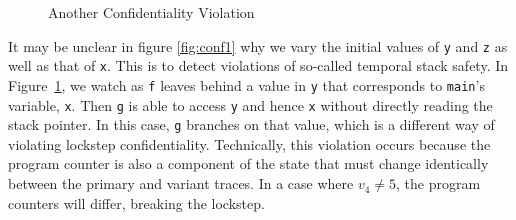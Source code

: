 \documentclass[acmsmall,review,anonymous]{acmart}\settopmatter{printfolios=true,printccs=false,printacmref=false}
\begin{document}
\begin{figure}
\begin{subfigure}{.65\textwidth}
\vspace{\abovedisplayskip}

\end{subfigure}

\caption{Another Confidentiality Violation}
\label{fig:conf2}
\end{figure}

It may be unclear in figure \ref{fig:conf1} why we vary the initial values of {\tt y}
and {\tt z} as well as that of {\tt x}. This is to detect violations of so-called
temporal stack safety.
In Figure~\ref{fig:conf2}, we watch as {\tt f} leaves behind a value in {\tt y}
that corresponds to {\tt main}'s variable, {\tt x}. Then {\tt g} is able to access
{\tt y} and hence {\tt x} without directly reading the stack pointer. In
this case, {\tt g} branches on that value, which is a different way of
violating lockstep confidentiality. Technically, this violation
occurs because the program counter is also a component of the state that must change
identically between the primary and variant traces. In a case where \(v_4 \not = 5\),
the program counters will differ, breaking the lockstep.
\end{document}
